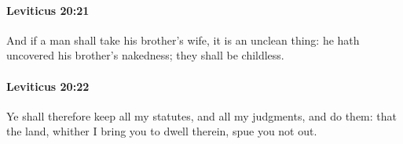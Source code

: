 		\paragraph{Leviticus 20:21} %
			\label{LEVITICUS-20-21}

			And if a man shall take his brother’s wife, it is an unclean thing: he hath uncovered his brother’s nakedness; they shall be childless.


		\paragraph{Leviticus 20:22} %
			\label{LEVITICUS-20-22}

			Ye shall therefore keep all my statutes, and all my judgments, and do them: that the land, whither I bring you to dwell therein, spue you not out.


